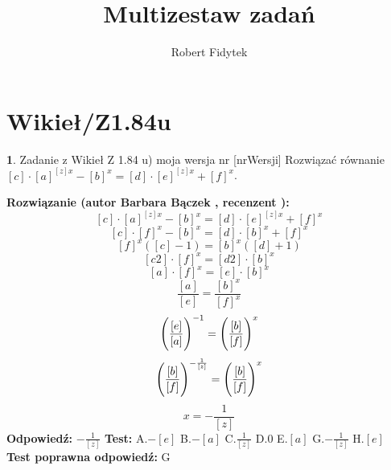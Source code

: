 \documentclass[12pt, a4paper]{article}
\title{Multizestaw zadań}
\author{Robert Fidytek}
\date{}
\theoremstyle{definition} %
\newtheorem{zad}{}
\newcommand{\kategoria}[1]{\section{#1}} %
\newcommand{\zadStart}[1]{\begin{zad}#1\newline} %
\newcommand{\zadStop}{\end{zad}}   %
\newcommand{\rozwStart}[2]{\noindent \textbf{Rozwiązanie (autor #1 , recenzent #2): }\newline} %
\newcommand{\rozwStop}{\newline}                                            %
\newcommand{\odpStart}{\noindent \textbf{Odpowiedź:}\newline}    %
\newcommand{\odpStop}{\newline}                                             %
\newcommand{\testStart}{\noindent \textbf{Test:}\newline} %
\newcommand{\testStop}{\newline} %
\newcommand{\kluczStart}{\noindent \textbf{Test poprawna odpowiedź:}\newline} %
\newcommand{\kluczStop}{\newline} %
\begin{document}
\maketitle


\kategoria{Wikieł/Z1.84u}
\zadStart{Zadanie z Wikieł Z 1.84 u) moja wersja nr [nrWersji]}
Rozwiązać równanie $[c] \cdot {[a]}^{[z]x}- {[b]}^x= [d] \cdot {[e]}^{[z]x}+ {[f]}^x$.
\zadStop
\rozwStart{Barbara Bączek}{}
$$[c] \cdot {[a]}^{[z]x}- {[b]}^x= [d] \cdot {[e]}^{[z]x}+ {[f]}^x$$
$$[c] \cdot {[f]}^x- {[b]}^x= [d] \cdot {[b]}^x+ {[f]}^x$$
$${[f]}^x([c]-1)= {[b]}^x([d]+1)$$
$$[c2] \cdot {[f]}^x= [d2] \cdot {[b]}^x$$
$$[a] \cdot  {[f]}^x= [e] \cdot {[b]}^x $$
$$\frac{[a]}{[e]}= \frac{{[b]}^x}{{[f]}^x}$$
$${\Bigg{(}\frac{[e]}{[a]} \Bigg{)}}^{-1}={\Bigg{(} \frac{[b]}{[f]} \Bigg{)}}^x$$
$${\Bigg{(}\frac{[b]}{[f]} \Bigg{)}}^{-\frac{1}{[z]}}={\Bigg{(} \frac{[b]}{[f]} \Bigg{)}}^x$$
$$x=-\frac{1}{[z]}$$
\rozwStop
\odpStart
$-\frac{1}{[z]}$
\odpStop
\testStart
A.$-[e]$
B.$-[a]$
C.$\frac{1}{[z]}$
D.$0$
E.$[a]$
G.$-\frac{1}{[z]}$
H.$[e]$
\testStop
\kluczStart
G
\kluczStop
\end{document}

